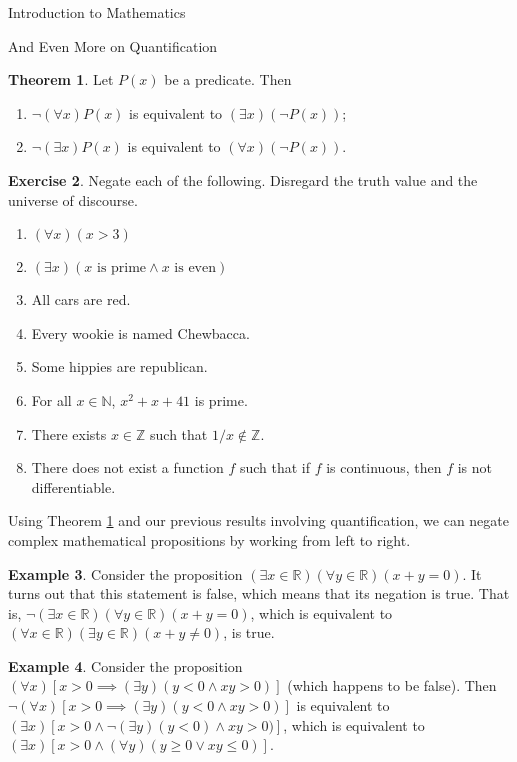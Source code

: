 \documentclass[11pt]{article}
\theoremstyle{definition}
\newtheorem{theorem}{Theorem}[section]
\newtheorem{example}[theorem]{Example}
\newtheorem{exercise}[theorem]{Exercise}
\begin{document}
\begin{section}{Introduction to Mathematics}
\begin{subsection}{And Even More on Quantification}
\begin{theorem}\label{thm:negation of quantifiers}
Let $P(x)$ be a predicate.  Then
\begin{enumerate}
\item[1.] $\neg (\forall x)P(x)$ is equivalent to $(\exists x)(\neg P(x))$;
\item[2.] $\neg (\exists x)P(x)$ is equivalent to $(\forall x)(\neg P(x))$.
\end{enumerate}
\end{theorem}

\begin{exercise}
Negate each of the following.  Disregard the truth value and the universe of discourse.
\begin{enumerate}
\item $(\forall x)(x>3)$
\item $(\exists x)(x \mbox{ is prime}\wedge x \mbox{ is even})$
\item All cars are red.
\item Every wookie is named Chewbacca.
\item Some hippies are republican.
\item For all $x\in\mathbb{N}$, $x^2+x+41$ is prime.
\item There exists $x\in\mathbb{Z}$ such that $1/x\notin\mathbb{Z}$.
\item There does not exist a function $f$ such that if $f$ is continuous, then $f$ is not differentiable.
\end{enumerate}
\end{exercise}

Using Theorem \ref{thm:negation of quantifiers} and our previous results involving quantification, we can negate complex mathematical propositions by working from left to right.

\begin{example}
Consider the proposition $(\exists x\in\mathbb{R})(\forall y\in\mathbb{R})(x+y=0)$.  It turns out that this statement is false, which means that its negation is true.  That is, $\neg(\exists x\in\mathbb{R})(\forall y\in\mathbb{R})(x+y=0)$, which is equivalent to $(\forall x\in\mathbb{R})(\exists y\in\mathbb{R})(x+y\neq 0)$, is true.
\end{example}

\begin{example}
Consider the proposition $(\forall x)[x>0\implies (\exists y)(y<0 \wedge xy>0)]$ (which happens to be false).  Then $\neg (\forall x)[x>0\implies (\exists y)(y<0 \wedge xy>0)]$ is equivalent to $(\exists x)[x>0 \wedge \neg (\exists y)(y<0) \wedge xy>0)]$, which is equivalent to $(\exists x)[x>0 \wedge (\forall y)(y\geq 0 \vee xy\leq 0)]$.
\end{example}


\end{subsection}
\end{section}
\end{document}
